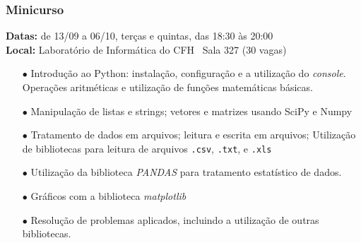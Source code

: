 \documentclass{beamer}
\begin{document}

\begin{frame}
\frametitle{\small{Minicurso}}
\begin{center}
	\vskip-0.3cm
\end{center}
\vskip-0.3cm
\small{%
\textbf{Datas:} de 13/09 a 06/10, terças e quintas, das 18:30 às 20:00\\
\textbf{Local:} Laboratório de Informática do CFH \textemdash\ Sala 327 (30 vagas)
}

\scriptsize{%
\begin{itemize}
  \setlength\itemsep{0em}
	\item[$\bullet$] Introdução ao Python: instalação, configuração e a utilização do \emph{console}. Operações aritméticas e utilização de funções matemáticas básicas.
	\item[$\bullet$] Manipulação de listas e strings; vetores e matrizes usando SciPy e Numpy
	\item[$\bullet$] Tratamento de dados em arquivos; leitura e escrita em arquivos; Utilização de bibliotecas para leitura de arquivos \texttt{.csv}, \texttt{.txt}, e \texttt{.xls}
	\item[$\bullet$] Utilização da biblioteca \emph{PANDAS} para tratamento estatístico de dados.
	\item[$\bullet$] Gráficos com a biblioteca \emph{matplotlib}
	\item[$\bullet$] Resolução de problemas aplicados, incluindo a utilização de outras bibliotecas.
\end{itemize}
}


\end{frame}
\end{document}
